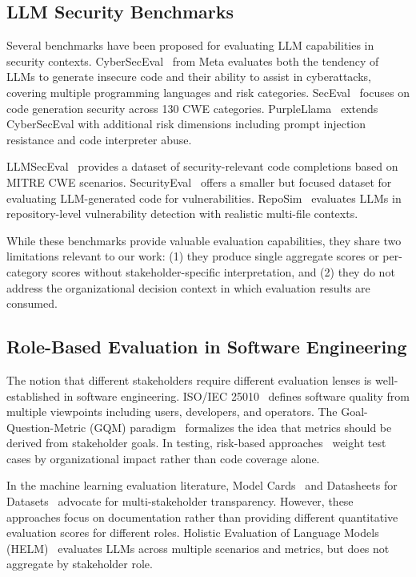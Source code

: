 \documentclass[10pt,twocolumn]{article}
\begin{document}
\subsection{LLM Security Benchmarks}

Several benchmarks have been proposed for evaluating LLM capabilities in security contexts. CyberSecEval~\citep{bhatt2023cyberseceval} from Meta evaluates both the tendency of LLMs to generate insecure code and their ability to assist in cyberattacks, covering multiple programming languages and risk categories. SecEval~\citep{li2023seceval} focuses on code generation security across 130 CWE categories. PurpleLlama~\citep{bhatt2024purplellama} extends CyberSecEval with additional risk dimensions including prompt injection resistance and code interpreter abuse.

LLMSecEval~\citep{tony2023llmseceval} provides a dataset of security-relevant code completions based on MITRE CWE scenarios. SecurityEval~\citep{siddiq2022securityeval} offers a smaller but focused dataset for evaluating LLM-generated code for vulnerabilities. RepoSim~\citep{zhang2024reposim} evaluates LLMs in repository-level vulnerability detection with realistic multi-file contexts.

While these benchmarks provide valuable evaluation capabilities, they share two limitations relevant to our work: (1) they produce single aggregate scores or per-category scores without stakeholder-specific interpretation, and (2) they do not address the organizational decision context in which evaluation results are consumed.

\subsection{Role-Based Evaluation in Software Engineering}

The notion that different stakeholders require different evaluation lenses is well-established in software engineering. ISO/IEC 25010~\citep{iso25010} defines software quality from multiple viewpoints including users, developers, and operators. The Goal-Question-Metric (GQM) paradigm~\citep{basili1994gqm} formalizes the idea that metrics should be derived from stakeholder goals. In testing, risk-based approaches~\citep{amland1999riskbased} weight test cases by organizational impact rather than code coverage alone.

In the machine learning evaluation literature, Model Cards~\citep{mitchell2019modelcards} and Datasheets for Datasets~\citep{gebru2021datasheets} advocate for multi-stakeholder transparency. However, these approaches focus on documentation rather than providing different quantitative evaluation scores for different roles. Holistic Evaluation of Language Models (HELM)~\citep{liang2022helm} evaluates LLMs across multiple scenarios and metrics, but does not aggregate by stakeholder role.
\end{document}
